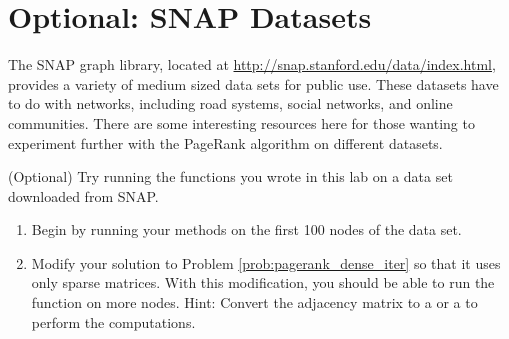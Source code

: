 \section*{Optional: SNAP Datasets}
The SNAP graph library, located at \url{http://snap.stanford.edu/data/index.html}, provides a variety of medium sized data sets for public use.
These datasets have to do with networks, including road systems, social networks, and online communities. There are some interesting resources here for those wanting to experiment further with the PageRank algorithm on different datasets.

\begin{problem}
(Optional) Try running the functions you wrote in this lab on a data set downloaded from SNAP.
\begin{enumerate}
\item Begin by running your methods on the first 100 nodes of the data set.
\item Modify your solution to Problem \ref{prob:pagerank_dense_iter} so that it uses only sparse matrices.
With this modification, you should be able to run the function on more nodes.
Hint: Convert the adjacency matrix to a  or a  to perform the computations.
\end{enumerate}
\end{problem}
